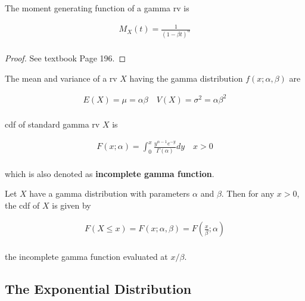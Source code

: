 \begin{proposition}
    The moment generating function of a gamma rv is
    
    \begin{align*}
        M_X(t) = \frac{1}{(1-\beta t)^\alpha} \\
    \end{align*}
\end{proposition}

\begin{proof}
    See textbook Page 196.
\end{proof}

\begin{proposition}
    The mean and variance of a rv $X$ having the gamma distribution $f(x;\alpha,\beta)$ are
    
    \begin{align*}
        E(X) = \mu = \alpha\beta \quad V(X) = \sigma^2 = \alpha\beta^2 \\
    \end{align*}
\end{proposition}

\begin{proposition}
    cdf of standard gamma rv $X$ is

    \begin{align*}
        F(x;\alpha) = \int_0^x\frac{y^{\alpha-1}e^{-y}}{\Gamma(\alpha)} dy \quad x>0 \\
    \end{align*}

    which is also denoted as \textbf{incomplete gamma function}.
\end{proposition}

\begin{proposition}
    Let $X$ have a gamma distribution with parameters $\alpha$ and $\beta$. Then for any $x>0$, the cdf of $X$ is given by

    \begin{align*}
        F(X\leq x) = F(x;\alpha,\beta) = F(\frac{x}{\beta};\alpha) \\
    \end{align*}

    the incomplete gamma function evaluated at $x/\beta$.
\end{proposition}

\subsection{The Exponential Distribution}


